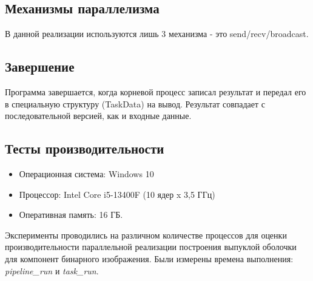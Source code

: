 \documentclass[12pt]{article}
\begin{document}
\subsection*{Механизмы параллелизма}
В данной реализации используются лишь 3 механизма - это send/recv/broadcast.

\subsection*{Завершение}
Программа завершается, когда корневой процесс записал результат и передал его в специальную структуру (TaskData) на вывод. Результат совпадает с последовательной версией, как и входные данные.

\newpage

\subsection*{Тесты производительности}
\label{subsec:performance_tests}

\begin{itemize}
    \item Операционная система: Windows 10
    \item Процессор: Intel Core i5-13400F (10 ядер x 3,5 ГГц)
    \item Оперативная память: 16 ГБ.
\end{itemize}

Эксперименты проводились на различном количестве процессов для оценки производительности параллельной реализации построения выпуклой оболочки для компонент бинарного изображения. Были измерены времена выполнения: \textit{pipeline\_run} и \textit{task\_run}.
\end{document}

